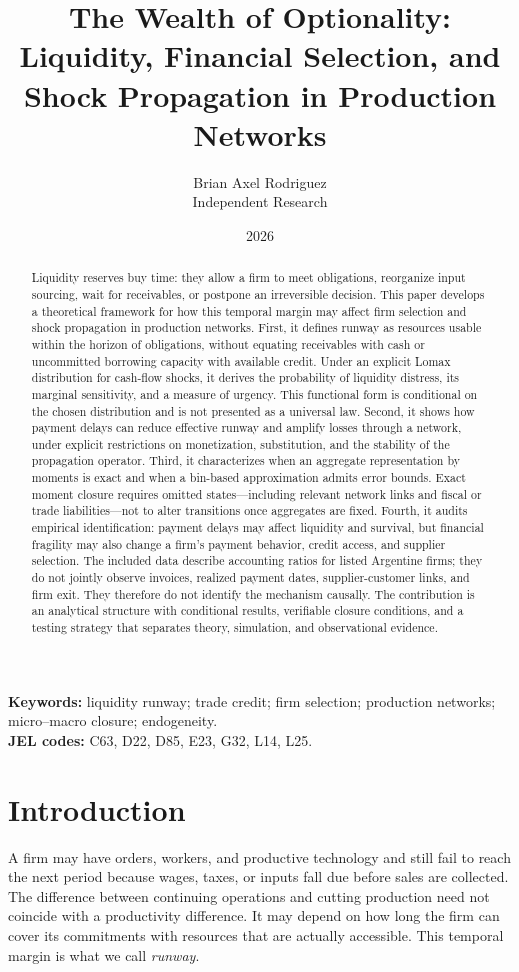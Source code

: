 \documentclass[11pt,a4paper]{article}
\title{\textbf{The Wealth of Optionality: Liquidity, Financial Selection, and Shock Propagation in Production Networks}}
\author{Brian Axel Rodriguez\\\small Independent Research}\date{2026}
\begin{document}
\maketitle
\begin{abstract}
Liquidity reserves buy time: they allow a firm to meet obligations, reorganize input sourcing, wait for receivables, or postpone an irreversible decision. This paper develops a theoretical framework for how this temporal margin may affect firm selection and shock propagation in production networks. First, it defines runway as resources usable within the horizon of obligations, without equating receivables with cash or uncommitted borrowing capacity with available credit. Under an explicit Lomax distribution for cash-flow shocks, it derives the probability of liquidity distress, its marginal sensitivity, and a measure of urgency. This functional form is conditional on the chosen distribution and is not presented as a universal law. Second, it shows how payment delays can reduce effective runway and amplify losses through a network, under explicit restrictions on monetization, substitution, and the stability of the propagation operator. Third, it characterizes when an aggregate representation by moments is exact and when a bin-based approximation admits error bounds. Exact moment closure requires omitted states—including relevant network links and fiscal or trade liabilities—not to alter transitions once aggregates are fixed. Fourth, it audits empirical identification: payment delays may affect liquidity and survival, but financial fragility may also change a firm’s payment behavior, credit access, and supplier selection. The included data describe accounting ratios for listed Argentine firms; they do not jointly observe invoices, realized payment dates, supplier-customer links, and firm exit. They therefore do not identify the mechanism causally. The contribution is an analytical structure with conditional results, verifiable closure conditions, and a testing strategy that separates theory, simulation, and observational evidence.
\end{abstract}
\noindent\textbf{Keywords:} liquidity runway; trade credit; firm selection; production networks; micro--macro closure; endogeneity.\\
\noindent\textbf{JEL codes:} C63, D22, D85, E23, G32, L14, L25.

\section{Introduction}
A firm may have orders, workers, and productive technology and still fail to reach the next period because wages, taxes, or inputs fall due before sales are collected. The difference between continuing operations and cutting production need not coincide with a productivity difference. It may depend on how long the firm can cover its commitments with resources that are actually accessible. This temporal margin is what we call \emph{runway}.
\end{document}
